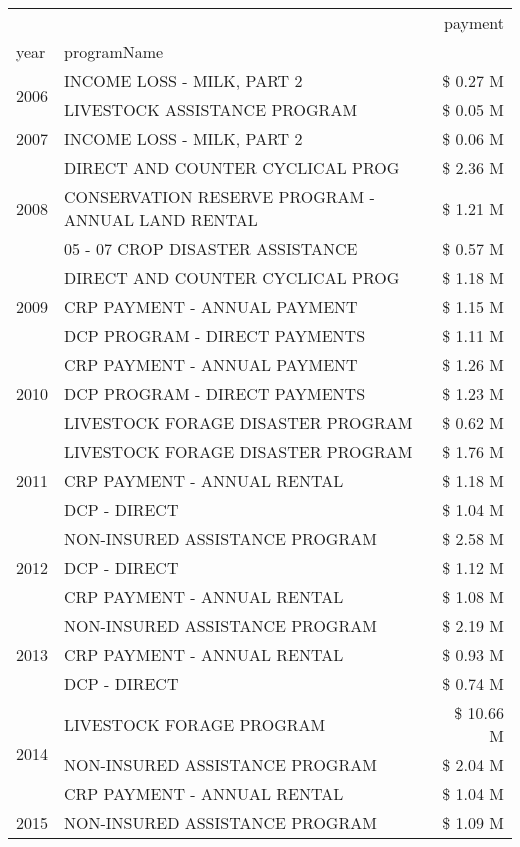 \begin{tabular}{llr}
\toprule
 &  & payment \\
year & programName &  \\
\midrule
\multirow[t]{2}{*}{2006} & INCOME LOSS - MILK, PART 2 & \$ 0.27 M \\
 & LIVESTOCK ASSISTANCE PROGRAM & \$ 0.05 M \\
\cline{1-3}
2007 & INCOME LOSS - MILK, PART 2 & \$ 0.06 M \\
\cline{1-3}
\multirow[t]{3}{*}{2008} & DIRECT AND COUNTER CYCLICAL PROG & \$ 2.36 M \\
 & CONSERVATION RESERVE PROGRAM - ANNUAL LAND RENTAL & \$ 1.21 M \\
 & 05 - 07 CROP DISASTER ASSISTANCE & \$ 0.57 M \\
\cline{1-3}
\multirow[t]{3}{*}{2009} & DIRECT AND COUNTER CYCLICAL PROG & \$ 1.18 M \\
 & CRP PAYMENT - ANNUAL PAYMENT & \$ 1.15 M \\
 & DCP PROGRAM - DIRECT PAYMENTS & \$ 1.11 M \\
\cline{1-3}
\multirow[t]{3}{*}{2010} & CRP PAYMENT - ANNUAL PAYMENT & \$ 1.26 M \\
 & DCP PROGRAM - DIRECT PAYMENTS & \$ 1.23 M \\
 & LIVESTOCK FORAGE DISASTER  PROGRAM & \$ 0.62 M \\
\cline{1-3}
\multirow[t]{3}{*}{2011} & LIVESTOCK FORAGE DISASTER PROGRAM & \$ 1.76 M \\
 & CRP PAYMENT - ANNUAL RENTAL & \$ 1.18 M \\
 & DCP - DIRECT & \$ 1.04 M \\
\cline{1-3}
\multirow[t]{3}{*}{2012} & NON-INSURED ASSISTANCE PROGRAM & \$ 2.58 M \\
 & DCP - DIRECT & \$ 1.12 M \\
 & CRP PAYMENT - ANNUAL RENTAL & \$ 1.08 M \\
\cline{1-3}
\multirow[t]{3}{*}{2013} & NON-INSURED ASSISTANCE PROGRAM & \$ 2.19 M \\
 & CRP PAYMENT - ANNUAL RENTAL & \$ 0.93 M \\
 & DCP - DIRECT & \$ 0.74 M \\
\cline{1-3}
\multirow[t]{3}{*}{2014} & LIVESTOCK FORAGE PROGRAM & \$ 10.66 M \\
 & NON-INSURED ASSISTANCE PROGRAM & \$ 2.04 M \\
 & CRP PAYMENT - ANNUAL RENTAL & \$ 1.04 M \\
\cline{1-3}
\multirow[t]{3}{*}{2015} & NON-INSURED ASSISTANCE PROGRAM & \$ 1.09 M \\

\end{tabular}
